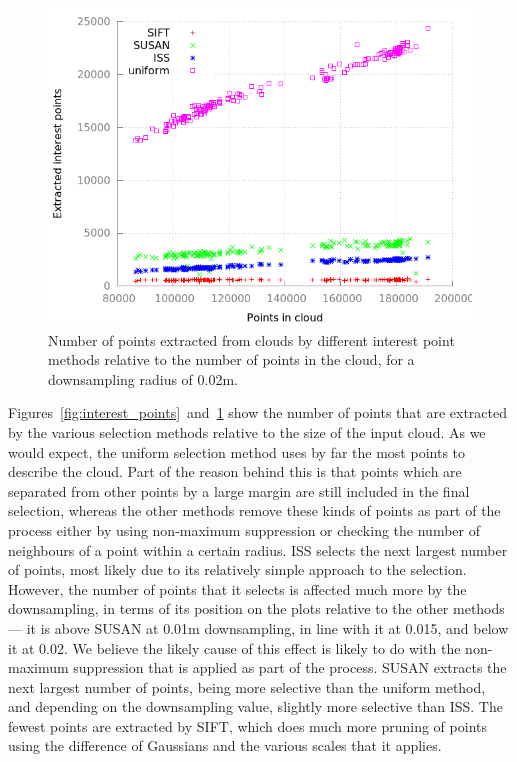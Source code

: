\documentclass[11pt,a4paper]{kth-mag}
\begin{document}
\begin{figure}
  \centering
  \includegraphics[width=\textwidth]{images/interest_points_0,02}
  \caption{Number of points extracted from clouds by different interest point
    methods relative to the number of points in the cloud, for a downsampling
    radius of 0.02m.}
  \label{fig:interest_points2}
\end{figure}

Figures~\ref{fig:interest_points}~and~\ref{fig:interest_points2} show the number of points that are extracted
by the various selection methods relative to the size of the input cloud. As we
would expect, the uniform selection method uses by far the most points to
describe the cloud. Part of the reason behind this is that points which are
separated from other points by a large margin are still included in the final
selection, whereas the other methods remove these kinds of points as part of the
process either by using non-maximum suppression or checking the number of
neighbours of a point within a certain radius. ISS selects the next largest
number of points, most likely due to its relatively simple approach to the
selection. However, the number of points that it selects is affected much more
by the downsampling, in terms of its position on the plots relative to the other
methods --- it is above SUSAN at 0.01m downsampling, in line with it at 0.015,
and below it at 0.02. We believe the likely cause of this effect is likely to do
with the non-maximum suppression that is applied as part of the process. SUSAN
extracts the next largest number of points, being more selective than the
uniform method, and depending on the downsampling value, slightly more selective
than ISS. The fewest points are extracted by SIFT, which does much more pruning
of points using the difference of Gaussians and the various scales that it
applies.
\end{document}
